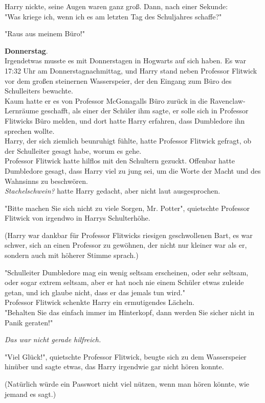 {Harry nickte, seine Augen waren ganz groß. Dann, nach einer Sekunde:\\ "Was kriege ich, wenn ich es am letzten Tag des Schuljahres schaffe?"

"Raus aus meinem Büro!"

\textbf{Donnerstag}.\\ Irgendetwas musste es mit Donnerstagen in Hogwarts auf sich haben. Es war 17:32 Uhr am Donnerstagnachmittag, und Harry stand neben Professor Flitwick vor dem großen steinernen Wasserspeier, der den Eingang zum Büro des Schulleiters bewachte.\\ Kaum hatte er es von Professor McGonagalls Büro zurück in die Ravenclaw-Lernräume geschafft, als einer der Schüler ihm sagte, er solle sich in Professor Flitwicks Büro melden, und dort hatte Harry erfahren, dass Dumbledore ihn sprechen wollte.\\ Harry, der sich ziemlich beunruhigt fühlte, hatte Professor Flitwick gefragt, ob der Schulleiter gesagt habe, worum es gehe.\\ Professor Flitwick hatte hilflos mit den Schultern gezuckt. Offenbar hatte Dumbledore gesagt, dass Harry viel zu jung sei, um die Worte der Macht und des Wahnsinns zu beschwören.\\ \emph{Stachelschwein?} hatte Harry gedacht, aber nicht laut ausgesprochen.

"Bitte machen Sie sich nicht zu viele Sorgen, Mr. Potter", quietschte Professor Flitwick von irgendwo in Harrys Schulterhöhe.

(Harry war dankbar für Professor Flitwicks riesigen geschwollenen Bart, es war schwer, sich an einen Professor zu gewöhnen, der nicht nur kleiner war als er, sondern auch mit höherer Stimme sprach.)

"Schulleiter Dumbledore mag ein wenig seltsam erscheinen, oder sehr seltsam, oder sogar extrem seltsam, aber er hat noch nie einem Schüler etwas zuleide getan, und ich glaube nicht, dass er das jemals tun wird."\\ Professor Flitwick schenkte Harry ein ermutigendes Lächeln.\\ "Behalten Sie das einfach immer im Hinterkopf, dann werden Sie sicher nicht in Panik geraten!"

\emph{Das war nicht gerade hilfreich.}

"Viel Glück!", quietschte Professor Flitwick, beugte sich zu dem Wasserspeier hinüber und sagte etwas, das Harry irgendwie gar nicht hören konnte.

(Natürlich würde ein Passwort nicht viel nützen, wenn man hören könnte, wie jemand es sagt.)

}
